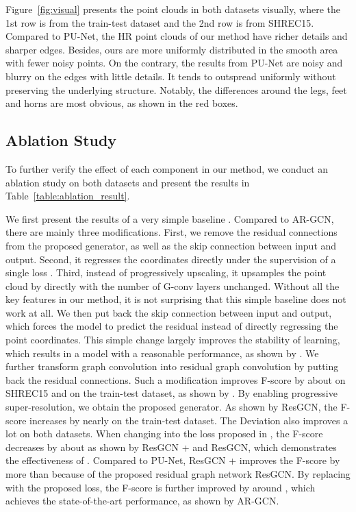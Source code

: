 \documentclass[10pt,twocolumn,letterpaper]{article}
\begin{document}
Figure~\ref{fig:visual} presents the point clouds in both datasets visually, where the 1st row is from the train-test dataset and the 2nd row is from SHREC15.
Compared to PU-Net, the HR point clouds of our method have richer details and sharper edges.
Besides, ours are more uniformly distributed in the smooth area with fewer noisy points.
On the contrary, the results from PU-Net are noisy and blurry on the edges with little details.
It tends to outspread uniformly without preserving the underlying structure.
Notably, the differences around the legs, feet and horns are most obvious, as shown in the red boxes.

\subsection{Ablation Study}
To further verify the effect of each component in our method, we conduct an ablation study on both datasets and present the results in Table~\ref{table:ablation_result}.

We first present the results of a very simple baseline .
Compared to AR-GCN, there are mainly three modifications.
First, we remove the residual connections from the proposed generator, as well as the skip connection between input and output.
Second, it regresses the coordinates directly under the supervision of a single loss .
Third, instead of progressively upscaling, it upsamples the point cloud by  directly with the number of G-conv layers unchanged.
Without all the key features in our method, it is not surprising that this simple baseline does not work at all.
We then put back the skip connection between input and output, which forces the model to predict the residual  instead of directly regressing the point coordinates.
This simple change largely improves the stability of learning, which results in a model with a reasonable performance, as shown by .
We further transform graph convolution into residual graph convolution by putting back the residual connections.
Such a modification improves F-score by about  on SHREC15 and  on the train-test dataset, as shown by .
By enabling progressive super-resolution, we obtain the proposed generator.
As shown by ResGCN, the F-score increases by nearly  on the train-test dataset.
The Deviation also improves a lot on both datasets.
When changing  into the loss proposed in \cite{yu2018pu}, the F-score decreases by about  as shown by ResGCN +  and ResGCN, which demonstrates the effectiveness of .
Compared to PU-Net, ResGCN +  improves the F-score by more than  because of the proposed residual graph network ResGCN.
By replacing  with the proposed loss, the F-score is further improved by around , which achieves the state-of-the-art performance, as shown by AR-GCN.
\end{document}
